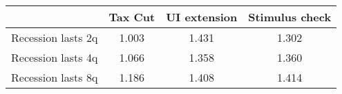 \begin{tabular}{@{}lccc@{}} 
\toprule 
& Tax Cut    & UI extension    & Stimulus check    \\  \midrule 
Recession lasts 2q &1.003  & 1.431  & 1.302     \\ 
Recession lasts 4q &1.066  & 1.358  & 1.360     \\ 
Recession lasts 8q &1.186  & 1.408  & 1.414     \\ 
\end{tabular}  
